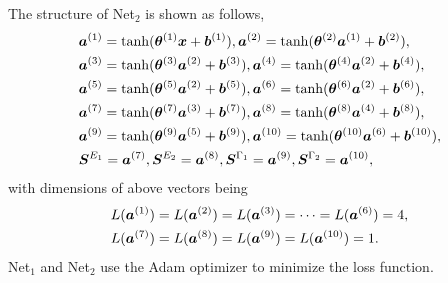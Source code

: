 \documentclass[twocolumn,showpacs,superscriptaddress,amsmath,amssymb,prc,preprintnumbers]{revtex4-1}
\begin{document}
The structure of Net$_2$ is shown as follows,
\begin{align}
&\boldsymbol{a}^{(1)} = {\rm tanh}(\boldsymbol{\theta}^{(1)} \boldsymbol{x} + \boldsymbol{b}^{(1)}) , \boldsymbol{a}^{(2)} = {\rm tanh}(\boldsymbol{\theta}^{(2)} \boldsymbol{a}^{(1)} + \boldsymbol{b}^{(2)}), \notag\\
&\boldsymbol{a}^{(3)} = {\rm tanh}(\boldsymbol{\theta}^{(3)} \boldsymbol{a}^{(2)} + \boldsymbol{b}^{(3)}) , \boldsymbol{a}^{(4)} = {\rm tanh}(\boldsymbol{\theta}^{(4)} \boldsymbol{a}^{(2)} + \boldsymbol{b}^{(4)}), \notag\\
&\boldsymbol{a}^{(5)} = {\rm tanh}(\boldsymbol{\theta}^{(5)} \boldsymbol{a}^{(2)} + \boldsymbol{b}^{(5)}) , \boldsymbol{a}^{(6)} = {\rm tanh}(\boldsymbol{\theta}^{(6)} \boldsymbol{a}^{(2)} + \boldsymbol{b}^{(6)}), \notag\\
&\boldsymbol{a}^{(7)} = {\rm tanh}(\boldsymbol{\theta}^{(7)} \boldsymbol{a}^{(3)} + \boldsymbol{b}^{(7)}) ,\boldsymbol{a}^{(8)} = {\rm tanh}(\boldsymbol{\theta}^{(8)} \boldsymbol{a}^{(4)} + \boldsymbol{b}^{(8)}), \notag\\
&\boldsymbol{a}^{(9)} = {\rm tanh}(\boldsymbol{\theta}^{(9)} \boldsymbol{a}^{(5)} + \boldsymbol{b}^{(9)}) ,\boldsymbol{a}^{(10)} = {\rm tanh}(\boldsymbol{\theta}^{(10)} \boldsymbol{a}^{(6)} + \boldsymbol{b}^{(10)}), \notag\\
&\boldsymbol{S}^{E_1} = \boldsymbol{a}^{(7)} ,   \boldsymbol{S}^{E_2} = \boldsymbol{a}^{(8)} , \boldsymbol{S}^{\Gamma_1} = \boldsymbol{a}^{(9)} ,  \boldsymbol{S}^{\Gamma_2} = \boldsymbol{a}^{(10)},
\end{align}
with dimensions of above vectors being
\begin{align}
&L(\boldsymbol{a}^{(1)}) =L(\boldsymbol{a}^{(2)})=L(\boldsymbol{a}^{(3)})= \cdots =L(\boldsymbol{a}^{(6)})= 4, \notag\\
&L(\boldsymbol{a}^{(7)}) =L(\boldsymbol{a}^{(8)}) =L(\boldsymbol{a}^{(9)}) =L(\boldsymbol{a}^{(10)}) =1.
\end{align}
Net$_1$ and Net$_2$ use the Adam optimizer to minimize the loss function.
\end{document}
